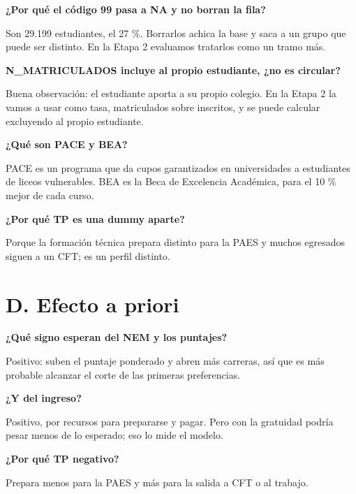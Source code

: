 \documentclass[11pt]{article}
\begin{document}
\textbf{¿Por qué el código 99 pasa a NA y no borran la fila?}\par
\begin{guion}Son 29.199 estudiantes, el 27 \%. Borrarlos achica la base y saca a un grupo que puede ser distinto. En la Etapa 2 evaluamos tratarlos como un tramo más.\end{guion}

\textbf{N\_MATRICULADOS incluye al propio estudiante, ¿no es circular?}\par
\begin{guion}Buena observación: el estudiante aporta a su propio colegio. En la Etapa 2 la vamos a usar como tasa, matriculados sobre inscritos, y se puede calcular excluyendo al propio estudiante.\end{guion}

\textbf{¿Qué son PACE y BEA?}\par
\begin{guion}PACE es un programa que da cupos garantizados en universidades a estudiantes de liceos vulnerables. BEA es la Beca de Excelencia Académica, para el 10 \% mejor de cada curso.\end{guion}

\textbf{¿Por qué TP es una dummy aparte?}\par
\begin{guion}Porque la formación técnica prepara distinto para la PAES y muchos egresados siguen a un CFT; es un perfil distinto.\end{guion}

\section*{D. Efecto a priori}

\textbf{¿Qué signo esperan del NEM y los puntajes?}\par
\begin{guion}Positivo: suben el puntaje ponderado y abren más carreras, así que es más probable alcanzar el corte de las primeras preferencias.\end{guion}

\textbf{¿Y del ingreso?}\par
\begin{guion}Positivo, por recursos para prepararse y pagar. Pero con la gratuidad podría pesar menos de lo esperado; eso lo mide el modelo.\end{guion}

\textbf{¿Por qué TP negativo?}\par
\begin{guion}Prepara menos para la PAES y más para la salida a CFT o al trabajo.\end{guion}
\end{document}
